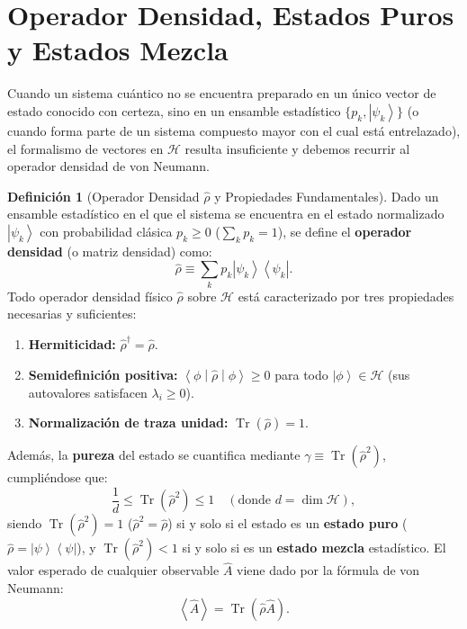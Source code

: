 \documentclass[11pt,a4paper,twoside]{report}
\theoremstyle{definition}
\newtheorem{definicion}{Definición}[chapter]
\theoremstyle{plain}
\theoremstyle{remark}
\newcommand{\ket}[1]{\left| #1 \right\rangle}
\newcommand{\ketbra}[2]{\left| #1 \right\rangle\!\left\langle #2 \right|}
\newcommand{\mel}[3]{\left\langle #1 \middle| #2 \middle| #3 \right\rangle}
\newcommand{\expval}[1]{\left\langle #1 \right\rangle}
\newcommand{\tr}{\operatorname{Tr}}
\newcommand{\Hil}{\mathcal{H}}
\newcommand{\op}[1]{\hat{#1}}
\begin{document}
\section{Operador Densidad, Estados Puros y Estados Mezcla}

Cuando un sistema cuántico no se encuentra preparado en un único vector de estado conocido con certeza, sino en un ensamble estadístico $\{p_k, \ket{\psi_k}\}$ (o cuando forma parte de un sistema compuesto mayor con el cual está entrelazado), el formalismo de vectores en $\Hil$ resulta insuficiente y debemos recurrir al operador densidad de von Neumann.

\begin{definicion}[Operador Densidad $\op{\rho}$ y Propiedades Fundamentales]
Dado un ensamble estadístico en el que el sistema se encuentra en el estado normalizado $\ket{\psi_k}$ con probabilidad clásica $p_k \ge 0$ ($\sum_k p_k = 1$), se define el \textbf{operador densidad} (o matriz densidad) como:
\begin{equation}
    \op{\rho} \equiv \sum_k p_k \ketbra{\psi_k}{\psi_k}.
\end{equation}
Todo operador densidad físico $\op{\rho}$ sobre $\Hil$ está caracterizado por tres propiedades necesarias y suficientes:
\begin{enumerate}[label=\arabic*.]
    \item \textbf{Hermiticidad:} $\op{\rho}^\dagger = \op{\rho}$.
    \item \textbf{Semidefinición positiva:} $\mel{\phi}{\op{\rho}}{\phi} \ge 0$ para todo $\ket{\phi} \in \Hil$ (sus autovalores satisfacen $\lambda_i \ge 0$).
    \item \textbf{Normalización de traza unidad:} $\tr(\op{\rho}) = 1$.
\end{enumerate}
Además, la \textbf{pureza} del estado se cuantifica mediante $\gamma \equiv \tr(\op{\rho}^2)$, cumpliéndose que:
\begin{equation}
    \frac{1}{d} \le \tr(\op{\rho}^2) \le 1 \quad (\text{donde } d = \dim\Hil),
\end{equation}
siendo $\tr(\op{\rho}^2) = 1$ ($\op{\rho}^2 = \op{\rho}$) si y solo si el estado es un \textbf{estado puro} ($\op{\rho} = \ketbra{\psi}{\psi}$), y $\tr(\op{\rho}^2) < 1$ si y solo si es un \textbf{estado mezcla} estadístico. El valor esperado de cualquier observable $\op{A}$ viene dado por la fórmula de von Neumann:
\begin{equation}
    \expval{\op{A}} = \tr(\op{\rho}\op{A}).
\end{equation}
\end{definicion}
\end{document}
